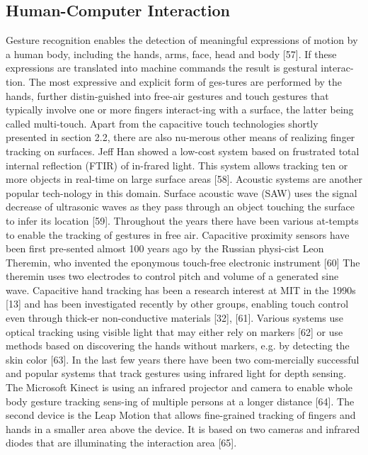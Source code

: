 \subsection{Human-Computer Interaction}
Gesture recognition enables the detection of meaningful expressions of motion by a human body, including the hands, arms, face, head and body [57]. If these expressions are translated into machine commands the result is gestural interac-tion. The most expressive and explicit form of ges-tures are performed by the hands, further distin-guished into free-air gestures and touch gestures that typically involve one or more fingers interact-ing with a surface, the latter being called multi-touch.
Apart from the capacitive touch technologies shortly presented in section 2.2, there are also nu-merous other means of realizing finger tracking on surfaces. Jeff Han showed a low-cost system based on frustrated total internal reflection (FTIR) of in-frared light. This system allows tracking ten or more objects in real-time on large surface areas [58]. Acoustic systems are another popular tech-nology in this domain. Surface acoustic wave (SAW) uses the signal decrease of ultrasonic waves as they pass through an object touching the surface to infer its location  [59].  
Throughout the years there have been various at-tempts to enable the tracking of gestures in free air. Capacitive proximity sensors have been first pre-sented almost 100 years ago by the Russian physi-cist Leon Theremin, who invented the eponymous touch-free electronic instrument [60] The theremin uses two electrodes to control pitch and volume of a generated sine wave. Capacitive hand tracking has been a research interest at MIT in the 1990s [13] and has been investigated recently by other groups, enabling touch control even through thick-er non-conductive materials [32], [61]. Various systems use optical tracking using visible light that may either rely on markers [62] or use methods based on discovering the hands without markers, e.g. by detecting the skin color [63]. 
In the last few years there have been two com-mercially successful and popular systems that track gestures using infrared light for depth sensing. The Microsoft Kinect is using an infrared projector and camera to enable whole body gesture tracking sens-ing of multiple persons at a longer distance [64]. The second device is the Leap Motion that allows fine-grained tracking of fingers and hands in a smaller area above the device. It is based on two cameras and infrared diodes that are illuminating the interaction area [65].

